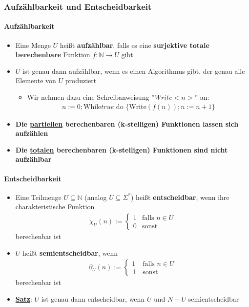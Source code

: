 \documentclass{scrartcl}
\begin{document}
\subsubsection{Aufzählbarkeit und Entscheidbarkeit}

\paragraph{Aufzählbarkeit}

\begin{itemize}
	\item Eine Menge $U$ heißt \textbf{aufzählbar}, falls es eine \textbf{surjektive totale berechenbare} Funktion $f: \mathbb{N} \rightarrow U$ gibt
	\item $U$ ist genau dann aufzählbar, wenn es einen Algorithmus gibt, der genau alle Elemente von $U$ produziert
	\begin{itemize}
		\item Wir nehmen dazu eine Schreibanweisung ''$Write <n>$'' an:
		\begin{align*}
			n:= 0; \text{While} true \text{ do } \{ \text{Write}(f(n)); n := n+1 \}
		\end{align*}
	\end{itemize}
	\item \textbf{Die \underline{partiellen} berechenbaren (k-stelligen) Funktionen lassen sich aufzählen}
	\item \textbf{Die \underline{totalen} berechenbaren (k-stelligen) Funktionen sind nicht aufzählbar}
\end{itemize}

\paragraph{Entscheidbarkeit}

\begin{itemize}
	\item Eine Teilmenge $U \subseteq \mathbb{N}$ (analog $U \subseteq \Sigma^*$) heißt \textbf{entscheidbar}, wenn ihre charakteristische Funktion
	\begin{align*}
		\chi_U(n) := \begin{cases}
			1 & \text{falls } n \in U \\
			0 & \text{sonst}
		\end{cases}
	\end{align*}
	berechenbar ist
	\item $U$ heißt \textbf{semientscheidbar}, wenn
	\begin{align*}
		\partial_U(n) := \begin{cases}
			1 & \text{falls } n \in U \\
			\bot & \text{sonst}
		\end{cases}
	\end{align*}
	berechenbar ist
	\item \textbf{\underline{Satz}}: $U$ ist genau dann entscheidbar, wenn $U$ und $N-U$ semientscheidbar
\end{itemize}
\end{document}
